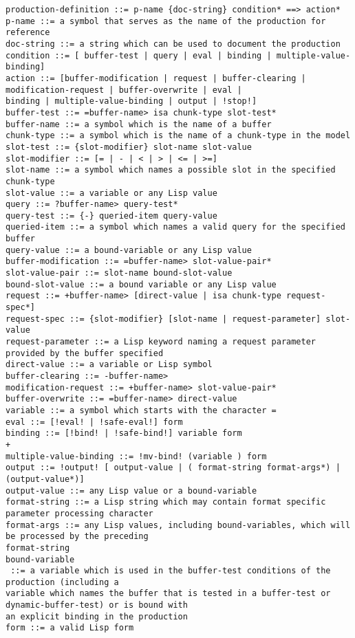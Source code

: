\begin{lstlisting}
production-definition ::= p-name {doc-string} condition* ==> action*
p-name ::= a symbol that serves as the name of the production for reference
doc-string ::= a string which can be used to document the production
condition ::= [ buffer-test | query | eval | binding | multiple-value-binding]
action ::= [buffer-modification | request | buffer-clearing | modification-request | buffer-overwrite | eval |
binding | multiple-value-binding | output | !stop!]
buffer-test ::= =buffer-name> isa chunk-type slot-test*
buffer-name ::= a symbol which is the name of a buffer
chunk-type ::= a symbol which is the name of a chunk-type in the model
slot-test ::= {slot-modifier} slot-name slot-value
slot-modifier ::= [= | - | < | > | <= | >=]
slot-name ::= a symbol which names a possible slot in the specified chunk-type
slot-value ::= a variable or any Lisp value
query ::= ?buffer-name> query-test*
query-test ::= {-} queried-item query-value
queried-item ::= a symbol which names a valid query for the specified buffer
query-value ::= a bound-variable or any Lisp value
buffer-modification ::= =buffer-name> slot-value-pair*
slot-value-pair ::= slot-name bound-slot-value
bound-slot-value ::= a bound variable or any Lisp value
request ::= +buffer-name> [direct-value | isa chunk-type request-spec*]
request-spec ::= {slot-modifier} [slot-name | request-parameter] slot-value
request-parameter ::= a Lisp keyword naming a request parameter provided by the buffer specified
direct-value ::= a variable or Lisp symbol
buffer-clearing ::= -buffer-name>
modification-request ::= +buffer-name> slot-value-pair*
buffer-overwrite ::= =buffer-name> direct-value
variable ::= a symbol which starts with the character =
eval ::= [!eval! | !safe-eval!] form
binding ::= [!bind! | !safe-bind!] variable form
+
multiple-value-binding ::= !mv-bind! (variable ) form
output ::= !output! [ output-value | ( format-string format-args*) | (output-value*)]
output-value ::= any Lisp value or a bound-variable
format-string ::= a Lisp string which may contain format specific parameter processing character
format-args ::= any Lisp values, including bound-variables, which will be processed by the preceding
format-string
bound-variable
 ::= a variable which is used in the buffer-test conditions of the production (including a
variable which names the buffer that is tested in a buffer-test or dynamic-buffer-test) or is bound with
an explicit binding in the production
form ::= a valid Lisp form
\end{lstlisting}




